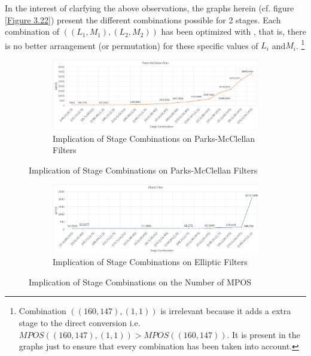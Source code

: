 In the interest of clarfying the above observations, the graphs herein (cf. figure \ref{Figure 3.22}) present the different combinations possible for 2 stages. Each combination of $((L_1,M_1), (L_2,M_2))$ has been optimized with \MATLAB, that is, there is no better arrangement (or permutation) for these specific values of $L_i$ and$ M_i$. \footnote{Combination $((160,147),(1,1))$ is irrelevant because it adds a extra stage to the direct conversion i.e. $MPOS((160,147),(1,1)) > MPOS((160,147))$. It is present in the graphs just to ensure that every combination has been taken into account.}

\vspace*{1cm}

\begin{figure}[htb!]	
	\centering
	\begin{subfigure}[b]{\textwidth}
		\centering
		\centerline{\includegraphics[scale=0.25]{2_stages_PM.png}}
		\caption{Implication of Stage Combinations on Parks-McClellan Filters}\label{Figure 22.a}
	\end{subfigure}
	\par\bigskip
\end{figure}

\begin{figure} [ht!]\ContinuedFloat
	\centering
	\begin{subfigure}[b]{\textwidth}
		\centering
		\centerline{\includegraphics[scale=0.25]{2_stages_Ellip.png}}
		\caption{Implication of Stage Combinations on Elliptic Filters}
		\label{Figure 22.b}
	\end{subfigure}
\captionsetup{width=0.95\linewidth}%
\caption{Implication of Stage Combinations on the Number of MPOS}
\end{figure}

